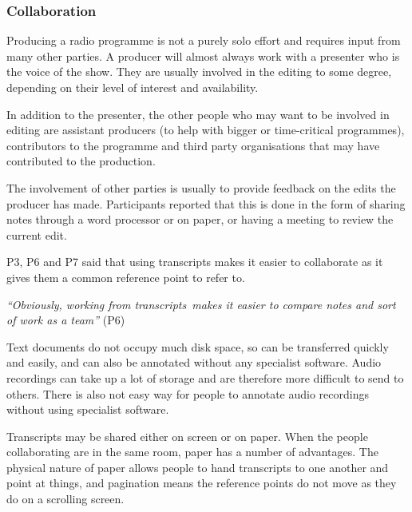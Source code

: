 \subsubsection{Collaboration}


Producing a radio programme is not a purely solo effort and requires input from many other parties. A producer will
almost always work with a presenter who is the voice of the show. They are usually involved in the editing to some
degree, depending on their level of interest and availability.

In addition to the presenter, the other people who may want to be involved in editing are assistant producers (to help
with bigger or time-critical programmes), contributors to the programme and third party organisations that
may have contributed to the production.

The involvement of other parties is usually to provide feedback on the edits the producer has made. Participants
reported that this is done in the form of sharing notes through a word processor or on paper, or having a meeting to
review the current edit.


P3, P6 and P7 said that using transcripts makes it easier to collaborate as it gives them a common reference point to
refer to.

\textit{``Obviously, working from transcripts makes it easier to compare notes and sort of work as a team''} (P6)

Text documents do not occupy much disk space, so can be transferred quickly and easily, and can also be annotated
without any specialist software. Audio recordings can take up a lot of storage and are therefore more difficult to
send to others. There is also not easy way for people to annotate audio recordings without using specialist software.



Transcripts may be shared either on screen or on paper. When the people collaborating are in the same room, paper has a
number of advantages.  The physical nature of paper allows people to hand transcripts to one another and point at
things, and pagination means the reference points do not move as they do on a scrolling screen.

